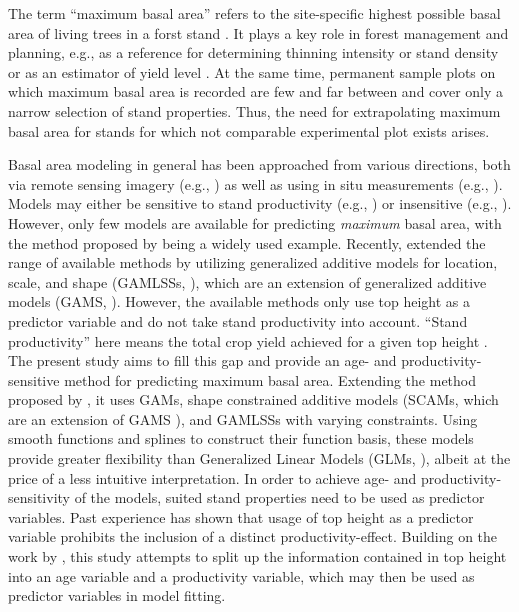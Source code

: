 The term ``maximum basal area'' refers to the site-specific highest possible basal area of living trees in a forst stand \parencite{Assmann1970}.  It plays a key role in forest management and planning, e.g., as a reference for determining thinning intensity \parencite{Assmann1961,Doebbeler2002} or stand density \parencite{Spellmann1999} or as an estimator of yield level \parencite{Franz1967}.  At the same time, permanent sample plots on which maximum basal area is recorded are few and far between and cover only a narrow selection of stand properties.  Thus, the need for extrapolating maximum basal area for stands for which not comparable experimental plot exists arises.

Basal area modeling in general has been approached from various directions, both via remote sensing imagery (e.g., \textcite{Silva2017}) as well as using in situ measurements (e.g., \textcite{Yue2012}).  Models may either be sensitive to stand productivity (e.g., \textcite{Castedo-Dorado2007}) or insensitive (e.g., \textcite{Monserud1996}).  However, only few models are available for predicting \emph{maximum} basal area, with the method proposed by \textcite{Sterba1975} being a widely used example.  Recently, \textcite{Woerdehoff2014,Woerdehoff2016} extended the range of available methods by utilizing generalized additive models for location, scale, and shape (GAMLSSs, \textcite{Rigby2001}), which are an extension of generalized additive models (GAMS, \textcite{Hastie1991}).  However, the available methods only use top height as a predictor variable and do not take stand productivity into account.  ``Stand productivity'' here means the total crop yield achieved for a given top height \parencite{Assmann1970}.  The present study aims to fill this gap and provide an age- and productivity-sensitive method for predicting maximum basal area.  Extending the method proposed by \textcite{Woerdehoff2016}, it uses GAMs, shape constrained additive models (SCAMs, which are an extension of GAMS \parencite{Pya2010}), and GAMLSSs with varying constraints.  Using smooth functions and splines to construct their function basis, these models provide greater flexibility than Generalized Linear Models (GLMs, \textcite{Nelder1972}), albeit at the price of a less intuitive interpretation.  In order to achieve age- and productivity-sensitivity of the models, suited stand properties need to be used as predictor variables.  Past experience has shown that usage of top height as a predictor variable prohibits the inclusion of a distinct productivity-effect.  Building on the work by \textcite{Nagel1999}, this study attempts to split up the information contained in top height into an age variable and a productivity variable, which may then be used as predictor variables in model fitting.

